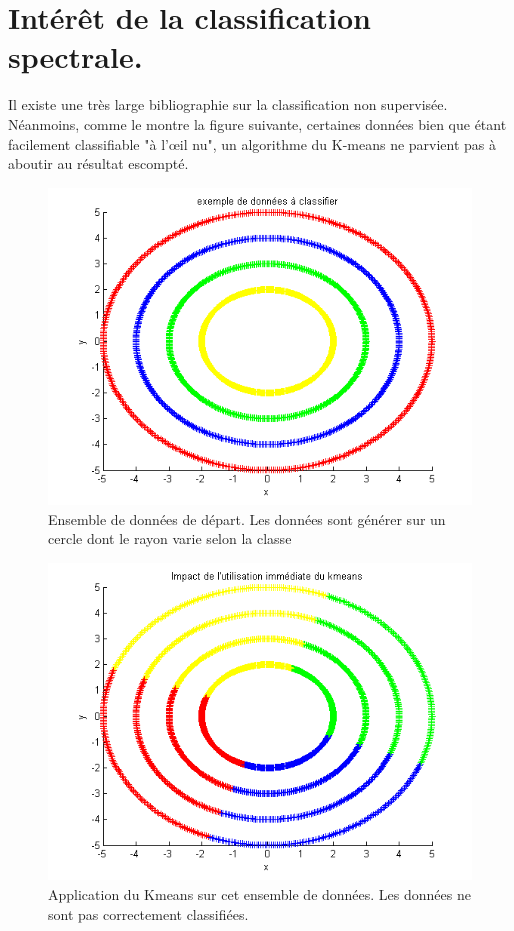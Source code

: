 \chapter{Intérêt de la classification spectrale.}

Il existe une très large bibliographie sur la classification non supervisée. Néanmoins, comme le montre la figure suivante, certaines données bien que étant facilement classifiable "à l'œil nu", un algorithme du K-means ne parvient pas à aboutir au résultat escompté.


\begin{figure}[H]
\centering
    \includegraphics[scale=0.6,angle=0]{Images/DataSet.png}
    \caption{Ensemble de données de départ. Les données sont générer sur un cercle dont le rayon varie selon la classe}
    \label{fig:DataSet}
\end{figure}

\begin{figure}[H]
\centering
    \includegraphics[scale=0.6,angle=0]{Images/AlgoKmeans.png}
    \caption{Application du Kmeans sur cet ensemble de données. Les données ne sont pas correctement classifiées.}
    \label{fig:AlgoKmeans}
\end{figure}

